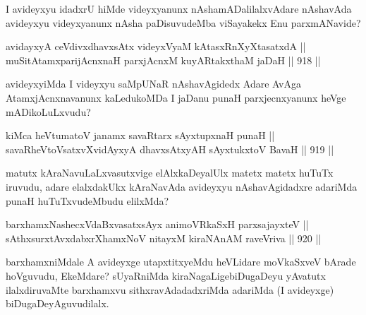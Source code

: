 \begin{artha}
I avideyxyu idadxrU hiMde videyxyanunx nAshamADalilalxvAdare nAshavAda avideyxyu videyxyanunx nAsha paDisuvudeMba viSayakekx Enu parxmANavide?
\end{artha}

\begin{shl}
avidayxyA ceVdivxdhavxsAtx videyxVyaM kAtasxRnXyXtasatxdA || \\
muSitAtamxparijAcnxnaH parxjAcnxM kuyARtakxthaM jaDaH \hfill || 918 ||  
\end{shl}

\begin{artha}
avideyxyiMda I videyxyu saMpUNaR nAshavAgidedx Adare AvAga AtamxjAcnxnavanunx kaLedukoMDa I jaDanu punaH parxjecnxyanunx heVge mADikoLuLxvudu?
\end{artha}

\begin{shl}
kiMca heVtumatoV janamx savaRtarx sAyxtupxnaH punaH || \\
savaRheVtoVsatxvXvidAyxyA dhavxsAtxyAH sAyxtukxtoV BavaH \hfill || 919 ||  
\end{shl}

\begin{artha}
matutx kAraNavuLaLxvasutxvige elAlxkaDeyalUlx matetx matetx huTuTx iruvudu, adare elalxdakUkx kAraNavAda avideyxyu nAshavAgidadxre adariMda punaH huTuTxvudeMbudu elilxMda?
\end{artha}

\begin{shl}
barxhamxNashecxVdaBxvasatxsAyx animoVRkaSxH parxsajayxteV || \\
sAthxsurxtAvxdabxrXhamxNoV nitayxM kiraNAnAM raveVriva \hfill || 920 ||  
\end{shl}

\begin{artha}
barxhamxniMdale A avideyxge utapxtitxyeMdu heVLidare moVkaSxveV bArade hoVguvudu, EkeMdare? sUyaRniMda kiraNagaLige\break biDugaDeyu yAvatutx ilalxdiruvaMte barxhamxvu sithxravAdadadxriMda adariMda (I avideyxge) biDugaDeyAguvudilalx.
\end{artha}





